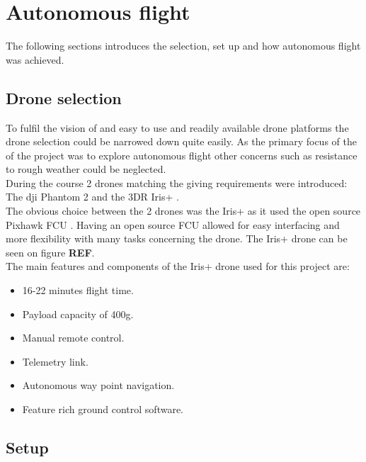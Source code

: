 \chapter{Autonomous flight}
The following sections introduces the selection, set up and how autonomous flight was achieved.

\section{Drone selection}
To fulfil the vision of and easy to use and readily available drone platforms the drone selection could be narrowed down quite easily. As the primary focus of the of the project was to explore autonomous flight other concerns such as resistance to rough weather could be neglected. \\
During the course 2 drones matching the giving requirements were introduced: The dji Phantom 2 \cite{Ref:dji} and the 3DR Iris+ \cite{Ref:3dr}.\\
The obvious choice between the 2 drones was the Iris+ as it used the open source Pixhawk FCU \cite{Ref:px4}. Having an open source FCU allowed for easy interfacing and more flexibility with many tasks concerning the drone. The Iris+ drone can be seen on figure \textbf{REF}.\\

The main features and components of the Iris+ drone used for this project are:
\begin{itemize}
\item 16-22 minutes flight time.
\item Payload capacity of 400g.
\item Manual remote control.
\item Telemetry link.
\item Autonomous way point navigation.
\item Feature rich ground control software.
\end{itemize}

\section{Setup}
